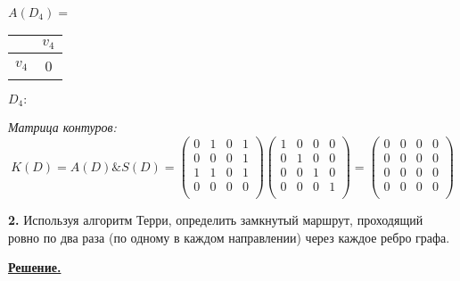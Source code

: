 \documentclass[12pt, letterpaper, titlepage]{article}
\begin{document}
$A(D_4)=$
\begin{tabular}{|c|c|}
    \hline
            & $v_{4}$ \\
    \hline
    $v_{4}$ & 0       \\
    \hline
\end{tabular}\hspace{1cm}$D_4:$\hspace{1cm}


\emph{Матрица контуров:}
\begin{equation*}
    K(D)=A(D) \& S(D) =
    \begin{pmatrix}
        0 & 1 & 0 & 1 \\
        0 & 0 & 0 & 1 \\
        1 & 1 & 0 & 1 \\
        0 & 0 & 0 & 0 \\
    \end{pmatrix}
    \begin{pmatrix}
        1 & 0 & 0 & 0 \\
        0 & 1 & 0 & 0 \\
        0 & 0 & 1 & 0 \\
        0 & 0 & 0 & 1 \\
    \end{pmatrix}
    =
    \begin{pmatrix}
        0 & 0 & 0 & 0 \\
        0 & 0 & 0 & 0 \\
        0 & 0 & 0 & 0 \\
        0 & 0 & 0 & 0 \\
    \end{pmatrix}
\end{equation*}

\textbf{2.} Используя алгоритм Терри, определить замкнутый маршрут, проходящий ровно по два раза
(по одному в каждом направлении) через каждое ребро графа.
\begin{center}\end{center}
\underline{\textbf{Решение.}}
\end{document}
